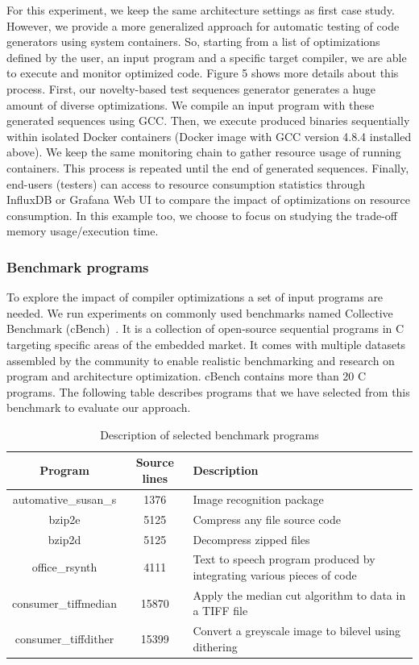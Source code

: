 For this experiment, we keep the same architecture settings as first case study. However, we provide a more generalized approach for automatic testing of code generators using system containers. So, starting from a list of optimizations defined by the user, an input program and a specific target compiler, we are able to execute and monitor optimized code. Figure 5 shows more details about this process. First, our novelty-based test sequences generator generates a huge amount of diverse optimizations. We compile an input program with these generated sequences using GCC. Then, we execute produced binaries sequentially within isolated Docker containers (Docker image with GCC version 4.8.4 installed above). We keep the same monitoring chain to gather resource usage of running containers. This process is repeated until the end of generated sequences. Finally, end-users (testers) can access to resource consumption statistics through InfluxDB or Grafana Web UI to compare the impact of optimizations on resource consumption. In this example too, we choose to focus on studying the trade-off memory usage/execution time. 
\subsubsection{Benchmark programs}
To explore the impact of compiler optimizations a set of input programs are needed. We run experiments on commonly used benchmarks named Collective Benchmark (cBench)~\cite{fursin2009collective}. It is a collection of open-source sequential programs in C targeting specific areas of the embedded market. It comes with multiple datasets assembled by the community to enable realistic benchmarking and research on program and architecture optimization. cBench contains more than 20 C programs. The following table describes programs that we have selected from this benchmark to evaluate our approach.
\begin{table}[h]
	\begin{center}
		\begin{tabular}{|c|c|p{3.9cm}|}
			\hline
			\textbf{Program} & \textbf{Source lines} & \textbf{Description}\\
			\hline
			automative\_susan\_s & 1376 & Image recognition package\\
			\hline
			bzip2e & 5125 & Compress any file
			source code \\
			\hline
			bzip2d & 5125 & Decompress zipped files \\
			\hline
			office\_rsynth & 4111 & Text to speech program produced by integrating various pieces of code\\
			\hline
			consumer\_tiffmedian& 15870 & Apply the median cut algorithm to data in a TIFF file
			\\
			
			\hline
			 consumer\_tiffdither& 15399 & Convert a greyscale image to bilevel using dithering
			 \\
			\hline
			
		\end{tabular}
		
	\end{center}
	\caption {Description of selected benchmark programs}
\end{table}
